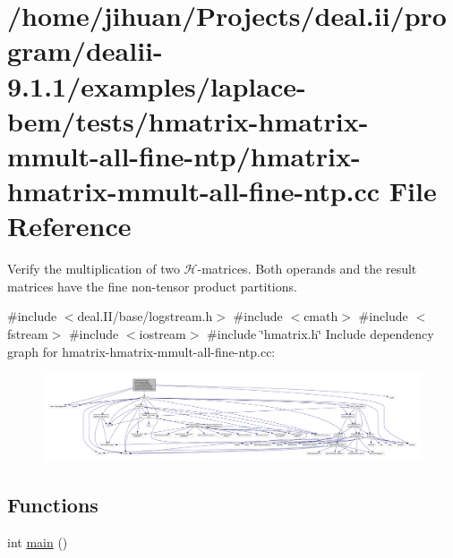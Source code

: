 \hypertarget{hmatrix-hmatrix-mmult-all-fine-ntp_8cc}{}\section{/home/jihuan/\+Projects/deal.ii/program/dealii-\/9.1.1/examples/laplace-\/bem/tests/hmatrix-\/hmatrix-\/mmult-\/all-\/fine-\/ntp/hmatrix-\/hmatrix-\/mmult-\/all-\/fine-\/ntp.cc File Reference}
\label{hmatrix-hmatrix-mmult-all-fine-ntp_8cc}


Verify the multiplication of two $\mathcal{H}$-\/matrices. Both operands and the result matrices have the fine non-\/tensor product partitions.  


{\ttfamily \#include $<$deal.\+I\+I/base/logstream.\+h$>$}\newline
{\ttfamily \#include $<$cmath$>$}\newline
{\ttfamily \#include $<$fstream$>$}\newline
{\ttfamily \#include $<$iostream$>$}\newline
{\ttfamily \#include \char`\"{}hmatrix.\+h\char`\"{}}\newline
Include dependency graph for hmatrix-\/hmatrix-\/mmult-\/all-\/fine-\/ntp.cc\+:\nopagebreak
\begin{figure}[H]
\begin{center}
\leavevmode
\includegraphics[width=350pt]{hmatrix-hmatrix-mmult-all-fine-ntp_8cc__incl}
\end{center}
\end{figure}
\subsection*{Functions}
\begin{DoxyCompactItemize}
\item 
int \hyperlink{hmatrix-hmatrix-mmult-all-fine-ntp_8cc_ae66f6b31b5ad750f1fe042a706a4e3d4}{main} ()
\end{DoxyCompactItemize}


